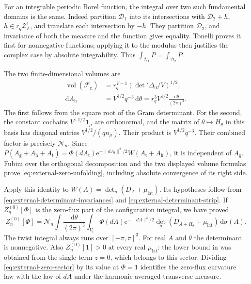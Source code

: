 \documentclass[11pt,letterpaper,reqno]{amsart}
\newcommand{\Z}{\mathbb Z}
\newcommand{\dd}{\mathrm d}
\begin{document}
For an integrable periodic Borel function, the integral
over two such fundamental domains is the same.
Indeed partition $\mathcal D_1$ into its intersections
with $\mathcal D_2+h$, $h\in r_q\mathcal Z^1_{\Z}$,
and translate each intersection by $-h$. They partition
$\mathcal D_2$, and invariance of both the measure and
the function gives equality. Tonelli proves it first
for nonnegative functions; applying it to the modulus
then justifies the complex case by absolute integrability.
Thus $\int_{\mathcal D_1}P=\int_{\mathcal D_2}P$.

The two finite-dimensional volumes are
\begin{align}
 \operatorname{vol}(\mathcal F_{\mathrm g})
    &=r_q^{V-1}(\det{}'\Delta_0/V)^{1/2},
                                     \label{eq:external-gauge-volume}\\
 \dd A_{\mathrm h}
    &=V^{1/2}q^{-3}\,\dd\theta
      =r_q^3V^{1/2}\frac{\dd\theta}{(2\pi)^3}.
                                     \label{eq:external-twist-Jacobian}
\end{align}
The first follows from the square root of the Gram
determinant. For the second, the constant cochains
$V^{-1/2}\mathbf1_\mu$ are orthonormal, and the
matrix of $\theta\mapsto H_\theta$ in this basis
has diagonal entries $V^{1/2}/(qn_\mu)$.
Their product is $V^{1/2}q^{-3}$.
Their combined factor is precisely $\mathcal N_n$.
Since $P(A_{\mathrm g}+A_{\mathrm h}+A_{\mathrm t})
=\Phi(dA_{\mathrm t})\mathrm e^{-\|dA_{\mathrm t}\|^2/2}
W(A_{\mathrm t}+A_{\mathrm h})$, it is independent
of $A_{\mathrm g}$. Fubini over the orthogonal
decomposition and the two displayed volume formulas
prove \eqref{eq:external-zero-unfolding}, including
absolute convergence of its right side.

Apply this identity to
$W(A)=\det_n(D_A+\mu_{\mathrm{lat}})$. Its hypotheses
follow from \eqref{eq:external-determinant-invariances}
and \eqref{eq:external-determinant-strip}. If
$Z_n^{(0)}[\Phi]$ is the zero-flux part of the
configuration integral, we have proved
\begin{equation}\label{eq:external-zero-sector}
 Z_n^{(0)}[\Phi]=\mathcal N_n
       \int\frac{\dd\theta}{(2\pi)^3}
       \int_{V_{\mathrm t}}\Phi(dA)\mathrm e^{-\|dA\|^2/2}
          \det_n(D_{A+H_\theta}+\mu_{\mathrm{lat}})\,\dd\sigma(A).
\end{equation}
The twist integral always runs over $[-\pi,\pi]^3$.
For real $A$ and $\theta$ the determinant is
nonnegative. Also $Z_n^{(0)}[1]>0$ at every real
$\mu_{\mathrm{lat}}$: the lower bound in
\cite[Proposition~2.3]{ChamberLattice} was obtained
from the single term $z=0$, which belongs to this
sector. Dividing \eqref{eq:external-zero-sector}
by its value at $\Phi=1$ identifies the zero-flux
curvature law with the law of $dA$ under the
harmonic-averaged transverse measure.
\end{document}

